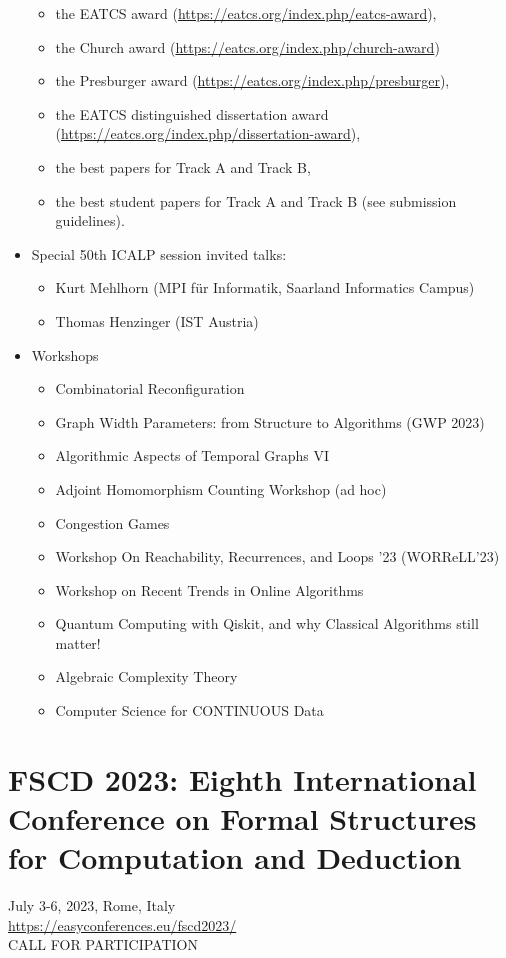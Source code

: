 \documentclass[prodmode,acmtecs]{acmsmall} %
\begin{document}
\begin{itemize}
\begin{itemize}\item  the EATCS award (\href{https://eatcs.org/index.php/eatcs-award}{https://eatcs.org/index.php/eatcs-award}),
\item  the Church award (\href{https://eatcs.org/index.php/church-award}{https://eatcs.org/index.php/church-award})
\item  the Presburger award (\href{https://eatcs.org/index.php/presburger}{https://eatcs.org/index.php/presburger}),
\item  the EATCS distinguished dissertation award (\href{https://eatcs.org/index.php/dissertation-award}{https://eatcs.org/index.php/dissertation-award}),
\item  the best papers for Track A and Track B,
\item  the best student papers for Track A and Track B (see submission guidelines).
\end{itemize} 
\item  Special 50th ICALP session invited talks: 
 
\begin{itemize}\item  Kurt Mehlhorn (MPI für Informatik, Saarland Informatics Campus)
\item  Thomas Henzinger (IST Austria)
\end{itemize} 
\item  Workshops 
 
\begin{itemize}\item  Combinatorial Reconfiguration
\item  Graph Width Parameters: from Structure to Algorithms (GWP 2023)
\item  Algorithmic Aspects of Temporal Graphs VI
\item  Adjoint Homomorphism Counting Workshop (ad hoc)
\item  Congestion Games
\item  Workshop On Reachability, Recurrences, and Loops '23 (WORReLL'23)
\item  Workshop on Recent Trends in Online Algorithms
\item  Quantum Computing with Qiskit, and why Classical Algorithms still matter!
\item  Algebraic Complexity Theory
\item  Computer Science for CONTINUOUS Data 
\end{itemize} 
\end{itemize}\section{FSCD 2023: Eighth International Conference on Formal Structures for Computation and Deduction }\label{FSCD2023}  July 3-6, 2023, Rome, Italy\\ 
  \href{https://easyconferences.eu/fscd2023/}{https://easyconferences.eu/fscd2023/}\\ 
CALL FOR PARTICIPATION 
\end{document}
